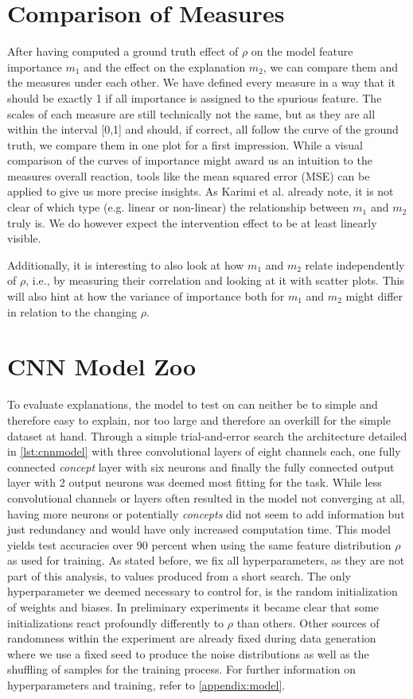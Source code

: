 \section{Comparison of Measures}\label{section:experiment_setup}
After having computed a ground truth effect of $\rho$ on the model feature importance $m_1$ and the effect on the explanation $m_2$, we can compare them and the measures under each other.
We have defined every measure in a way that it should be exactly 1 if all importance is assigned to the spurious feature. The scales of each measure are still technically not the same, but as they are all within the interval [0,1] and should, if correct, all follow the curve of the ground truth, we compare them in one plot for a first impression.
While a visual comparison of the curves of importance might award us an intuition to the measures overall reaction, tools like the mean squared error (MSE) can be applied to give us more precise insights. As Karimi et al. \cite{Karimi2023} already note,
it is not clear of which type (e.g. linear or non-linear) the relationship between $m_1$ and $m_2$ truly is. We do however expect the intervention effect to be at least linearly visible. 

Additionally, it is interesting to also look at how $m_1$ and $m_2$ relate independently of $\rho$, i.e., by measuring their correlation and looking at it with scatter plots. 
This will also hint at how the variance of importance both for $m_1$ and $m_2$ might differ in relation to the changing $\rho$. 


\section{CNN Model Zoo}\label{section:model_zoo}
To evaluate explanations, the model to test on can neither be to simple and therefore easy to explain, nor too large and therefore an overkill for the simple dataset at hand.
Through a simple trial-and-error search the architecture detailed in \cref{lst:cnnmodel} with three convolutional layers of eight channels each, one fully connected \textit{concept} layer with six neurons and finally the fully connected output layer with 2 output neurons was deemed most fitting for the task. While less convolutional channels or layers often resulted in the model not converging at all, having more neurons or potentially \textit{concepts} did not seem to add information but just redundancy and would have only increased computation time.
This model yields test accuracies over 90 percent when using the same feature distribution $\rho$ as used for training. As stated before, we fix all hyperparameters, as they are not part of this analysis, to values produced from a short search.
The only hyperparameter we deemed necessary to control for, is the random initialization of weights and biases. In preliminary experiments it became clear that some initializations react profoundly differently to $\rho$ than others. Other sources of randomness within the experiment are already fixed during data generation where we use a fixed seed to produce the noise distributions as well as the shuffling of samples for the training process. 
For further information on hyperparameters and training, refer to \cref{appendix:model}.
